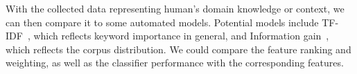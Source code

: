 With the collected data representing human's domain knowledge or context, we can then compare it to some automated models. 
Potential models include TF-IDF~\cite{ramos2003using}, which reflects keyword importance in general, and Information gain~\cite{kent1983information}, which reflects the corpus distribution. 
We could compare the feature ranking and weighting, as well as the classifier performance with the corresponding features.